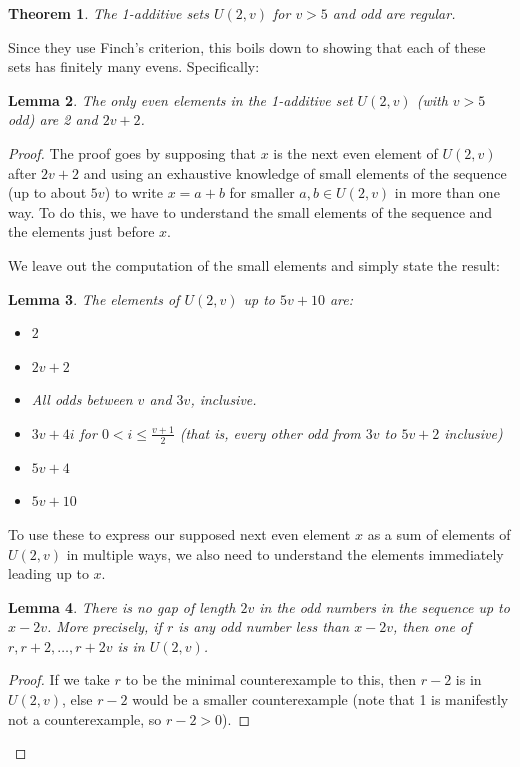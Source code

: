 \documentclass{article}
\newtheorem{theorem}{Theorem}[section]
\newtheorem{lemma}[theorem]{Lemma}
\theoremstyle{definition}
\theoremstyle{remark}
\numberwithin{equation}{section}
\begin{document}
\begin{theorem}
The 1-additive sets $U(2,v)$ for $v > 5$ and odd are regular.
\end{theorem}

Since they use Finch's criterion, this boils down to showing that each
of these sets has finitely many evens.  Specifically: 

\begin{lemma}The only even elements in the 1-additive set $U(2,v)$
  (with $v > 5$ odd) are 2 and $2v+2$.
\end{lemma}


\begin{proof}
  The proof goes by supposing that $x$ is the next even element of
  $U(2,v)$ after $2v+2$ and using an exhaustive knowledge of small
  elements of the sequence (up to about $5v$) to write $x = a+b$ for
  smaller $a, b \in U(2,v)$ in more than one way.  To do this, we have
  to understand the small elements of the sequence and the elements
  just before $x$.  

  We leave out the computation of the small elements and simply state
  the result: 

  \begin{lemma}
    The elements of $U(2,v)$ up to $5v+10$ are: 

    \begin{itemize}
      \item $2$
      \item $2v+2$
      \item All odds between $v$ and $3v$, inclusive.
      \item $3v+4i$ for $0 < i \leq \frac{v+1}{2}$ (that is, every
        other odd from $3v$ to $5v+2$ inclusive)
      \item $5v+4$
      \item $5v+10$
    \end{itemize}
  \end{lemma}

  To use these to express our supposed next even element $x$ as a sum
  of elements of $U(2,v)$ in multiple ways, we also need to understand
  the elements immediately leading up to $x$.  

  \begin{lemma}
    There is no gap of length $2v$ in the odd numbers in the sequence
    up to $x-2v$.  More precisely, if $r$ is any odd number less than
    $x-2v$, then one of $r, r+2, \ldots, r+2v$ is in $U(2,v)$.  
  \end{lemma}
  \begin{proof}
    If we take $r$ to be the minimal counterexample to this, then $r-2$
    is in $U(2,v)$, else $r-2$ would be a smaller counterexample (note
    that 1 is manifestly not a counterexample, so $r-2 > 0$).  


\end{proof}
\end{proof}
\end{document}
